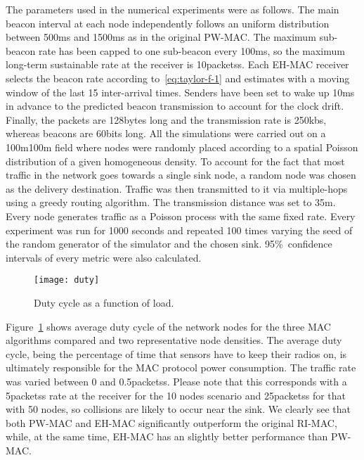 \documentclass[journal,english,twocolumn,10pt,letterpaper]{IEEEtran}
\begin{document}
The parameters used in the numerical experiments were as follows. The main
beacon interval at each node independently follows an uniform distribution
between 500ms and 1500ms as in the original PW-MAC. The maximum
sub-beacon rate has been capped to one sub-beacon every 100ms, so the
maximum long-term sustainable rate at the receiver is 10packetss. Each
EH-MAC receiver selects the beacon rate according to~\eqref{eq:taylor-f-1} and
estimates  with a moving window of the last 15 inter-arrival
times. Senders have been set to wake up 10ms in advance to the predicted
beacon transmission to account for the clock drift. Finally, the packets are
128bytes long and the transmission rate is 250kbs, whereas beacons
are 60bits long.
All the simulations were carried out on a 100m100m field where
nodes were randomly placed according to a spatial Poisson distribution of a
given homogeneous density. To account for the fact that most traffic in the
network goes towards a single sink node, a random node was chosen as the
delivery destination. Traffic was then transmitted to it via multiple-hops
using a greedy routing algorithm.
The transmission distance was set to 35m. Every node generates traffic as
a Poisson process with the same fixed rate. Every experiment was run
for 1000 seconds and repeated 100 times varying the seed of the random
generator of the simulator and the chosen sink. 95\%~confidence intervals
of every metric were also calculated.

\begin{figure}
  \centering
  \texttt{[image: duty]}
  \caption{Duty cycle as a function of load.}
  \label{fig:duty-cycle}
\end{figure}
Figure~\ref{fig:duty-cycle} shows average duty cycle of the network nodes for
the three MAC algorithms compared and two representative node densities. The
average duty cycle, being the percentage of time that sensors have to keep
their radios on, is ultimately responsible for the MAC protocol power
consumption. The traffic rate was varied between 0 and 0.5packetss.
Please note that this corresponds with a 5packetss rate at the receiver
for the 10 nodes scenario and 25packetss for that with 50 nodes, so
collisions are likely to occur near the sink. We clearly see that both PW-MAC
and EH-MAC significantly outperform the original RI-MAC, while, at the same
time, EH-MAC has an slightly better performance than PW-MAC.
\end{document}
